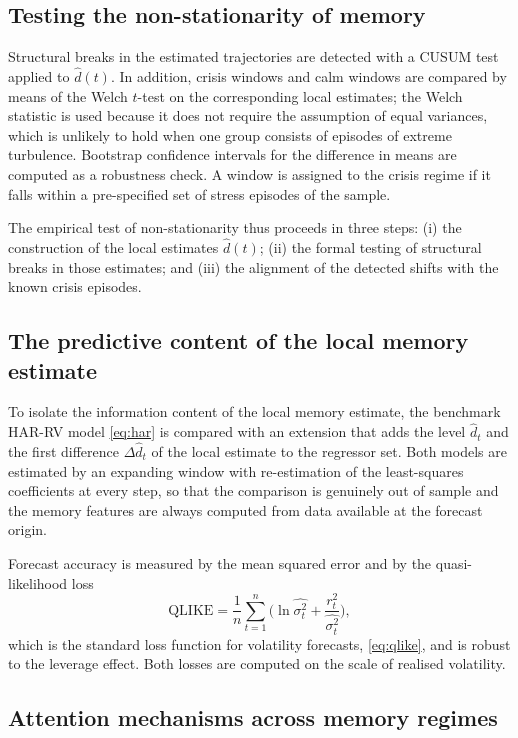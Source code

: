 \documentclass[journal]{IEEEtran}
\begin{document}
\subsection{Testing the non-stationarity of memory}

Structural breaks in the estimated trajectories are detected with a CUSUM test applied to
$\hat d(t)$. In addition, crisis windows and calm windows are compared by means of the Welch
$t$-test on the corresponding local estimates; the Welch statistic is used because it does not
require the assumption of equal variances, which is unlikely to hold when one group consists of
episodes of extreme turbulence. Bootstrap confidence intervals for the difference in means are
computed as a robustness check. A window is assigned to the crisis regime if it falls within a
pre-specified set of stress episodes of the sample.

The empirical test of non-stationarity thus proceeds in three steps: (i) the construction of the
local estimates $\hat d(t)$; (ii) the formal testing of structural breaks in those estimates; and
(iii) the alignment of the detected shifts with the known crisis episodes.

\subsection{The predictive content of the local memory estimate}

To isolate the information content of the local memory estimate, the benchmark HAR-RV model
\eqref{eq:har} is compared with an extension that adds the level $\hat d_t$ and the first
difference $\Delta\hat d_t$ of the local estimate to the regressor set. Both models are estimated
by an expanding window with re-estimation of the least-squares coefficients at every step, so
that the comparison is genuinely out of sample and the memory features are always computed from
data available at the forecast origin.

Forecast accuracy is measured by the mean squared error and by the quasi-likelihood loss
\begin{equation}\label{eq:qlike}
\mathrm{QLIKE}=\frac{1}{n}\sum_{t=1}^{n}\Big(\ln \widehat{\sigma^2_t}
+\frac{r^2_t}{\widehat{\sigma^2_t}}\Big),
\end{equation}
which is the standard loss function for volatility forecasts, \eqref{eq:qlike}, and is robust to the
leverage effect.
Both losses are computed on the scale of realised volatility.

\subsection{Attention mechanisms across memory regimes}
\end{document}
